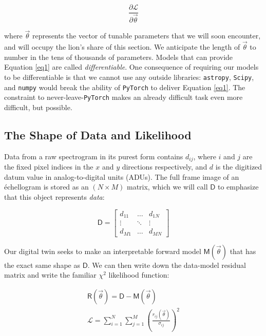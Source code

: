 \documentclass[twocolumn]{aastex631}
\begin{document}
\begin{equation}
  \frac{\partial{\mathcal{L}}}{\partial{\vec{\theta}}} \label{eq1}
\end{equation}

\noindent where $\vec{\theta}$ represents the vector of tunable parameters that we will soon encounter, and will occupy the lion's share of this section.  We anticipate the length of $\vec{\theta}$ to number in the tens of thousands of parameters.  Models that can provide Equation \ref{eq1} are called \emph{differentiable}.  One consequence of requiring our models to be differentiable is that we cannot use any outside libraries: \texttt{astropy}, \texttt{Scipy}, and \texttt{numpy} would break the ability of \texttt{PyTorch} to deliver Equation \ref{eq1}.  The constraint to never-leave-\texttt{PyTorch} makes an already difficult task even more difficult, but possible.

\subsection{The Shape of Data and Likelihood}
Data from a raw spectrogram in its purest form contains $d_{ij}$, where $i$ and $j$ are the fixed pixel indices in the $x$ and $y$ directions respectively, and $d$ is the digitized datum value in analog-to-digital units (ADUs).  The full frame image of an \'echellogram is stored as an $(N \times M)$ matrix, which we will call $\boldsymbol{\mathsf{D}}$ to emphasize that this object represents \emph{data}:

\begin{equation}
  \boldsymbol{\mathsf{D}} =  \begin{bmatrix}
    d_{11} & \dots  & d_{1N} \\
    \vdots & \ddots & \vdots \\
    d_{M1} & \dots  & d_{MN}
  \end{bmatrix}
\end{equation}

Our digital twin seeks to make an interpretable forward model $\boldsymbol{\mathsf{M}}(\vec{\theta})$ that has the exact same shape as $\boldsymbol{\mathsf{D}}$.  We can then write down the data-model residual matrix and write the familiar $\chi^2$ likelihood function:

\begin{eqnarray}
  \boldsymbol{\mathsf{R}}(\vec{\theta}) = \boldsymbol{\mathsf{D}} - \boldsymbol{\mathsf{M}}(\vec{\theta}) \\
  \mathcal{L} = \sum_{i=1}^{N}\sum_{j=1}^{M} \left ( \frac{r_{ij}(\vec{\theta})}{\sigma_{ij}} \right )^2 \label{eqChiSq}
\end{eqnarray}
\end{document}
